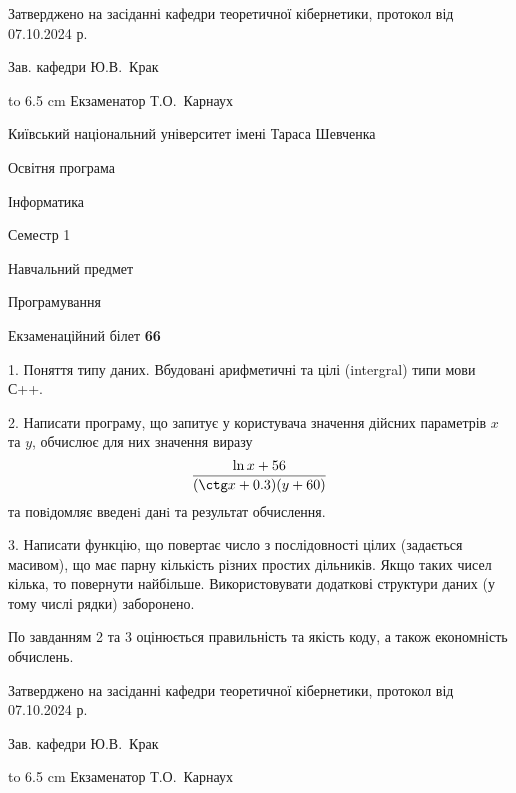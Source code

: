 \documentclass[12pt, ukrainian]{article}
\begin{document}
{\smallskip\smallskip \begin {scriptsize} Затверджено на засіданні кафедри теоретичної кібернетики, протокол   від   07.10.2024 р.\par\smallskip\smallskip\smallskip\smallskip
{\parbox {6.5 cm} {Зав. кафедри \dotfill Ю.В.~Крак}}\hspace {0.7cm} {\hbox to 6.5 cm { Екзаменатор \dotfill Т.О.~Карнаух}} \end{scriptsize}}
\vspace{0.9cm}
{{\begin {scriptsize}\par
{ \center  Київський національний університет імені Тараса Шевченка \par}
{\parbox {5 cm}{Освітня програма \hfill}{\parbox {7 cm}{Інформатика\hfill}}\parbox {6 cm}{\hfill Семестр 1}}\par
{\parbox {5 cm} {Навчальний предмет \hfill}\parbox {7 cm}{Програмування \hfill}\parbox {6cm}{\hfill}\par}\vspace{-15pt} \end{scriptsize}}{\center Екзаменаційний білет \No \textbf { 66 }\par}}
{%
1. Поняття типу даних. Вбудовані арифметичні та цілі (intergral) типи мови С++.%
\par
2. Написати програму, що запитує у користувача значення дійсних параметрів $x$ та $y$, обчислює для них значення виразу 
$$\frac{\ln x + 56}{(\ctg x + 0.3) (y + 60)}$$ 
та повiдомляє введенi данi та результат обчислення.

\par
3. Написати функцію, що повертає число з послідовності цілих (задається масивом), що має парну кількість різних простих дільників. Якщо таких чисел кілька, то повернути найбільше. Використовувати додаткові структури даних (у тому числі рядки) заборонено.

По завданням 2 та 3 оцінюється правильність та якість коду, а також економність обчислень.

}
{\smallskip\smallskip \begin {scriptsize} Затверджено на засіданні кафедри теоретичної кібернетики, протокол   від   07.10.2024 р.\par\smallskip\smallskip\smallskip\smallskip
{\parbox {6.5 cm} {Зав. кафедри \dotfill Ю.В.~Крак}}\hspace {0.7cm} {\hbox to 6.5 cm { Екзаменатор \dotfill Т.О.~Карнаух}} \end{scriptsize}}
\end{document}
